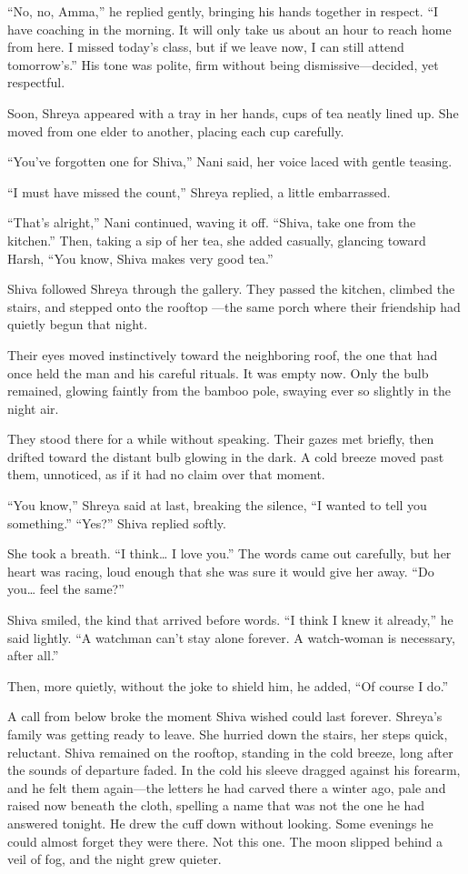 ``No, no, Amma,'' he replied gently, bringing his hands together in respect. ``I have coaching in the morning. It will only take us about an hour to reach home from here. I missed today's class, but if we leave now, I can still attend tomorrow's.'' His tone was polite, firm without being dismissive—decided, yet respectful.

Soon, Shreya appeared with a tray in her hands, cups of tea neatly lined up. She moved from one elder to another, placing each cup carefully.

``You've forgotten one for Shiva,'' Nani said, her voice laced with gentle teasing.

``I must have missed the count,'' Shreya replied, a little embarrassed.

``That's alright,'' Nani continued, waving it off. ``Shiva, take one from the kitchen.'' Then, taking a sip of her tea, she added casually, glancing toward Harsh, ``You know, Shiva makes very good tea.''

Shiva followed Shreya through the gallery. They passed the kitchen, climbed the stairs, and stepped onto the rooftop —the same porch where their friendship had quietly begun that night.

Their eyes moved instinctively toward the neighboring roof, the one that had once held the man and his careful rituals. It was empty now. Only the bulb remained, glowing faintly from the bamboo pole, swaying ever so slightly in the night air.

They stood there for a while without speaking. Their gazes met briefly, then drifted toward the distant bulb glowing in the dark. A cold breeze moved past them, unnoticed, as if it had no claim over that moment.

``You know,'' Shreya said at last, breaking the silence, ``I wanted to tell you something.'' ``Yes?'' Shiva replied softly.

She took a breath. ``I think… I love you.'' The words came out carefully, but her heart was racing, loud enough that she was sure it would give her away. ``Do you… feel the same?''

Shiva smiled, the kind that arrived before words. ``I think I knew it already,'' he said lightly. ``A watchman can't stay alone forever. A watch-woman is necessary, after all.''

Then, more quietly, without the joke to shield him, he added, ``Of course I do.''

A call from below broke the moment Shiva wished could last forever. Shreya's family was getting ready to leave. She hurried down the stairs, her steps quick, reluctant. Shiva remained on the rooftop, standing in the cold breeze, long after the sounds of departure faded. In the cold his sleeve dragged against his forearm, and he felt them again—the letters he had carved there a winter ago, pale and raised now beneath the cloth, spelling a name that was not the one he had answered tonight. He drew the cuff down without looking. Some evenings he could almost forget they were there. Not this one. The moon slipped behind a veil of fog, and the night grew quieter.

